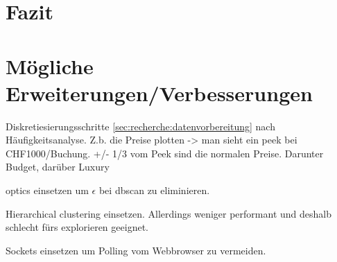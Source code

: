 \section{Fazit}

\section{Mögliche Erweiterungen/Verbesserungen}
Diskretiesierungsschritte \cref{sec:recherche:datenvorbereitung} nach Häufigkeitsanalyse.
Z.b. die Preise plotten -> man sieht ein peek bei CHF1000/Buchung. +/- 1/3 vom Peek sind die normalen Preise. Darunter Budget, darüber Luxury

\gls{optics} einsetzen um $\epsilon$ bei \gls{dbscan} zu eliminieren.

Hierarchical clustering einsetzen. Allerdings weniger performant und deshalb schlecht fürs explorieren geeignet.

Sockets einsetzen um Polling vom Webbrowser zu vermeiden.